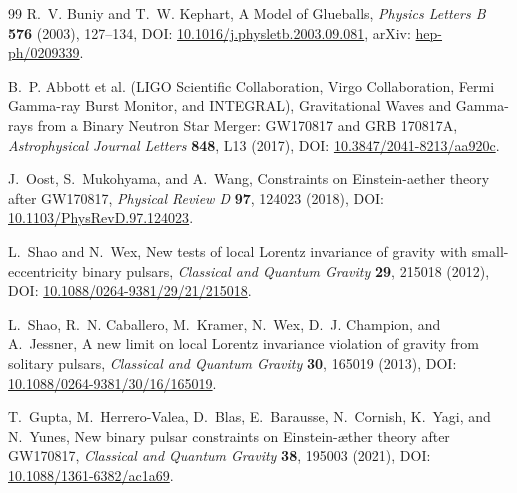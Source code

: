 \documentclass[11pt]{article}
\theoremstyle{definition}
\theoremstyle{plain}
\theoremstyle{remark}
\begin{document}
\begin{thebibliography}{99}
            R.~V. Buniy and T.~W. Kephart,
            \newblock A Model of Glueballs,
            \newblock \emph{Physics Letters B} \textbf{576} (2003), 127--134,
            \newblock DOI: \href{https://doi.org/10.1016/j.physletb.2003.09.081}{10.1016/j.physletb.2003.09.081},
            \newblock arXiv: \href{https://arxiv.org/abs/hep-ph/0209339}{hep-ph/0209339}.

            B.~P. Abbott et al. (LIGO Scientific Collaboration, Virgo Collaboration, Fermi Gamma-ray Burst Monitor, and INTEGRAL),
            \newblock Gravitational Waves and Gamma-rays from a Binary Neutron Star Merger: GW170817 and GRB 170817A,
            \newblock \emph{Astrophysical Journal Letters} \textbf{848}, L13 (2017),
            \newblock DOI: \href{https://doi.org/10.3847/2041-8213/aa920c}{10.3847/2041-8213/aa920c}.

            J.~Oost, S.~Mukohyama, and A.~Wang,
            \newblock Constraints on Einstein-aether theory after GW170817,
            \newblock \emph{Physical Review D} \textbf{97}, 124023 (2018),
            \newblock DOI: \href{https://doi.org/10.1103/PhysRevD.97.124023}{10.1103/PhysRevD.97.124023}.

            L.~Shao and N.~Wex,
            \newblock New tests of local Lorentz invariance of gravity with small-eccentricity binary pulsars,
            \newblock \emph{Classical and Quantum Gravity} \textbf{29}, 215018 (2012),
            \newblock DOI: \href{https://doi.org/10.1088/0264-9381/29/21/215018}{10.1088/0264-9381/29/21/215018}.

            L.~Shao, R.~N. Caballero, M.~Kramer, N.~Wex, D.~J. Champion, and A.~Jessner,
            \newblock A new limit on local Lorentz invariance violation of gravity from solitary pulsars,
            \newblock \emph{Classical and Quantum Gravity} \textbf{30}, 165019 (2013),
            \newblock DOI: \href{https://doi.org/10.1088/0264-9381/30/16/165019}{10.1088/0264-9381/30/16/165019}.

            T.~Gupta, M.~Herrero-Valea, D.~Blas, E.~Barausse, N.~Cornish, K.~Yagi, and N.~Yunes,
            \newblock New binary pulsar constraints on Einstein-\ae ther theory after GW170817,
            \newblock \emph{Classical and Quantum Gravity} \textbf{38}, 195003 (2021),
            \newblock DOI: \href{https://doi.org/10.1088/1361-6382/ac1a69}{10.1088/1361-6382/ac1a69}.


\end{thebibliography}
\end{document}
